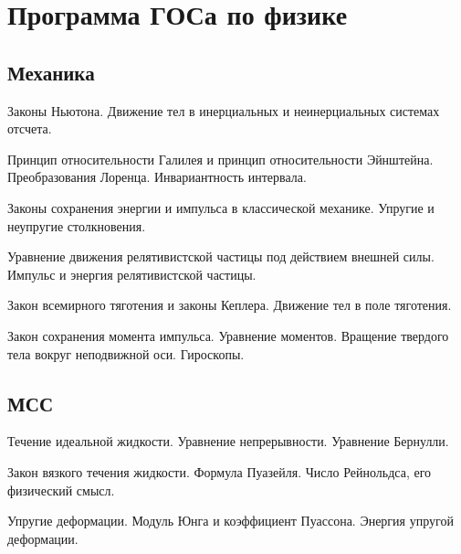 \section*{Программа ГОСа по физике}

\subsection*{Механика}
\begin{enumerate*}
\item Законы Ньютона. Движение тел в инерциальных и неинерциальных системах отсчета.
\item Принцип относительности Галилея и принцип относительности Эйнштейна. Преобразования Лоренца. Инвариантность интервала.
\item Законы сохранения энергии и импульса в классической механике. Упругие и неупругие столкновения.
\item Уравнение движения релятивистской частицы под действием внешней силы. Импульс и энергия
релятивистской частицы.
\item Закон всемирного тяготения и законы Кеплера. Движение тел в поле тяготения.
\item Закон сохранения момента импульса. Уравнение моментов. Вращение твердого тела вокруг неподвижной оси. Гироскопы.
\end{enumerate*}


\subsection*{МСС}
\begin{enumerate*}
\setcounter{enumi}{6}
\item Течение идеальной жидкости. Уравнение непрерывности. Уравнение Бернулли.
\item Закон вязкого течения жидкости. Формула Пуазейля. Число Рейнольдса, его физический смысл.
\item Упругие деформации. Модуль Юнга и коэффициент Пуассона. Энергия упругой деформации.

\end{enumerate*}


